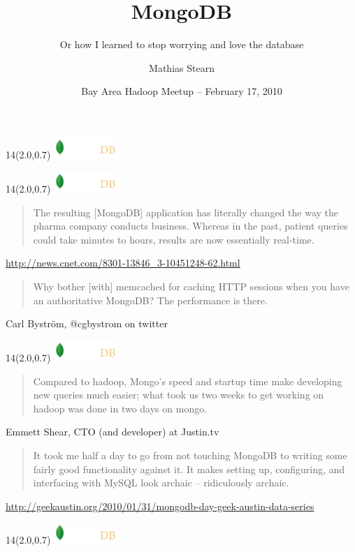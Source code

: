 \documentclass{beamer}
\title{MongoDB}
\subtitle{Or how I learned to stop worrying and love the database}
\author{Mathias Stearn}
\institute{10gen}
\date{Bay Area Hadoop Meetup -- February 17, 2010}
\newcommand{\MongoLogo}{
\begin{textblock}{14}(2.0,0.7)
  \includegraphics[height=0.8cm]{logo-mongodb-ondark.png}
\end{textblock}
}
\begin{document}
\begin{frame}
  \MongoLogo
  \titlepage
\end{frame}

\begin{frame}
  \MongoLogo

  \begin{quote}
    The resulting [MongoDB] application has literally changed the way the
    pharma company conducts business. Whereas in the past, patient queries
    could take minutes to hours, results are now essentially real-time.
  \end{quote}
  \small \url{http://news.cnet.com/8301-13846_3-10451248-62.html}

  \begin{quote}
    Why bother [with] memcached for caching HTTP sessions when you have an
    authoritative MongoDB? The performance is there.
  \end{quote}
  \small Carl Byström, @cgbystrom on twitter
\end{frame}

\begin{frame}
  \MongoLogo

  \begin{quote}
    Compared to hadoop, Mongo's speed and startup time make developing new
    queries much easier; what took us two weeks to get working on hadoop was
    done in two days on mongo.
  \end{quote}
  \small Emmett Shear, CTO (and developer) at Justin.tv

  \begin{quote}
    It took me half a day to go from not touching MongoDB to writing some
    fairly good functionality against it. It makes setting up, configuring, and
    interfacing with MySQL look archaic -- ridiculously archaic.
  \end{quote}
  \small \url{http://geekaustin.org/2010/01/31/mongodb-day-geek-austin-data-series}
\end{frame}


\begin{frame}
  \MongoLogo
  \tableofcontents
\end{frame}
\end{document}
